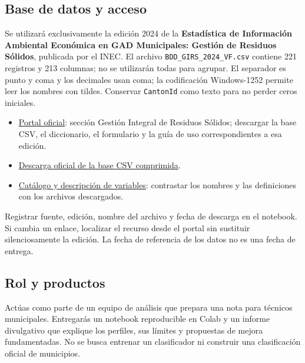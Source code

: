 \documentclass[a4,11pt]{aleph-notas}
\begin{document}
\subsection*{Base de datos y acceso}
Se utilizará exclusivamente la edición 2024 de la \textbf{Estadística de Información Ambiental Económica en GAD Municipales: Gestión de Residuos Sólidos}, publicada por el INEC. El archivo \texttt{BDD\_GIRS\_2024\_VF.csv} contiene 221 registros y 213 columnas; no se utilizarán todas para agrupar. El separador es punto y coma y los decimales usan coma; la codificación Windows-1252 permite leer los nombres con tildes. Conservar \texttt{CantonId} como texto para no perder ceros iniciales.
\begin{itemize}[leftmargin=*]
    \item \href{https://www.ecuadorencifras.gob.ec/gad-municipales/}{Portal oficial}: sección Gestión Integral de Residuos Sólidos; descargar la base CSV, el diccionario, el formulario y la guía de uso correspondientes a esa edición.
    \item \href{https://www.ecuadorencifras.gob.ec/documentos/web-inec/Encuestas_Ambientales/Municipios/2024/grs/2_BDD_DATOS_ABIERTOS_GRS_GADM_2024_12_CSV.zip}{Descarga oficial de la base CSV comprimida}.
    \item \href{https://anda.inec.gob.ec/anda5/index.php/catalog/1294/data-dictionary/F18?file_name=BDD_GIRS_2024_VF}{Catálogo y descripción de variables}: contrastar los nombres y las definiciones con los archivos descargados.
\end{itemize}
Registrar fuente, edición, nombre del archivo y fecha de descarga en el notebook. Si cambia un enlace, localizar el recurso desde el portal sin sustituir silenciosamente la edición. La fecha de referencia de los datos no es una fecha de entrega.

\subsection*{Rol y productos}
Actúas como parte de un equipo de análisis que prepara una nota para técnicos municipales. Entregarás un notebook reproducible en Colab y un informe divulgativo que explique los perfiles, sus límites y propuestas de mejora fundamentadas. No se busca entrenar un clasificador ni construir una clasificación oficial de municipios.
\end{document}
